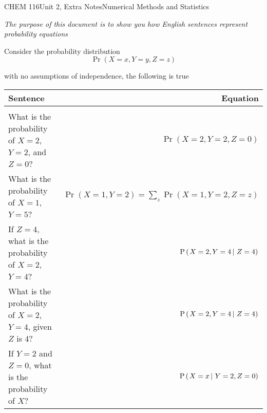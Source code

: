 \documentclass{article}
\begin{document}
\begin{tdoc}{CHEM 116}{Unit 2, Extra Notes}{Numerical Methods and Statistics}

  \emph{The purpose of this document is to show you how English
    sentences represent probability equations}

  Consider the probability distribution
  \begin{equation}
    \Pr(X=x, Y=y, Z=z)
  \end{equation}

  with no assumptions of independence, the following is true

  \vspace{0.5cm}

  \begin{tabular}{lr}
    Sentence & Equation\\
    \hline\\
    What is the probability of $X=2$, $Y=2$, and $Z=0$? & $\Pr(X=2, Y=2, Z=0)$\\
    What is the probability of $X=1$, $Y=5$? & $\Pr(X=1, Y=2) = \sum_z\Pr(X=1, Y=2, Z=z)$\\
    If $Z=4$, what is the probability of $X=2$, $Y=4$? & $\textrm{P} \left( \left.X=2, Y=4 \, \right| \,Z=4 \right)$\\
    What is the probability of $X=2$, $Y=4$, given $Z$ is 4? & $\textrm{P} \left( \left.X=2, Y=4 \, \right| \,Z=4 \right)$\\
    If $Y=2$ and $Z = 0$, what is the probability of $X$? & $\textrm{P} \left( \left.X=x \, \right| \,Y=2, Z=0 \right)$\\
  \end{tabular}


\end{tdoc}
\end{document}
